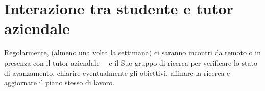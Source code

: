 \section*{Interazione tra studente e tutor aziendale}

Regolarmente, (almeno una volta la settimana) ci saranno incontri da remoto o in presenza con il tutor aziendale \nomeTutorAziendale\ \cognomeTutorAziendale\ e il Suo gruppo di ricerca per verificare lo stato di avanzamento, chiarire eventualmente gli obiettivi, affinare la ricerca e aggiornare il piano stesso di lavoro.